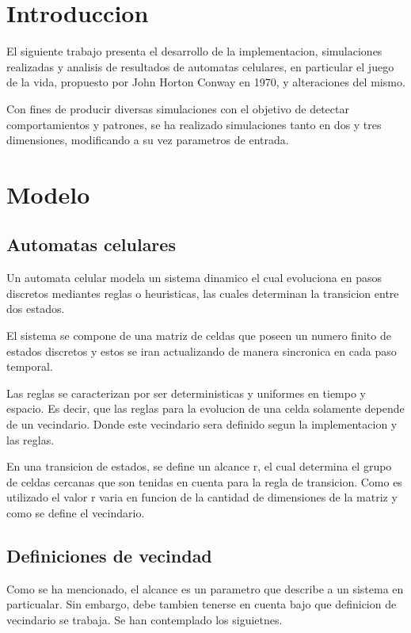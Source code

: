\documentclass[11pt]{article}
\begin{document}
    \tableofcontents


    \section{Introduccion}
    El siguiente trabajo presenta el desarrollo de la implementacion, simulaciones realizadas y analisis de resultados de
    automatas celulares, en particular el juego de la vida, propuesto por John Horton Conway en 1970, y alteraciones del mismo.

    Con fines de producir diversas simulaciones con el objetivo de detectar comportamientos y patrones, se ha realizado
    simulaciones tanto en dos y tres dimensiones, modificando a su vez parametros de entrada.

    \section{Modelo}

    \subsection{Automatas celulares}

    Un automata celular modela un sistema dinamico el cual evoluciona en pasos discretos mediantes reglas o heuristicas,
     las cuales determinan la transicion entre dos estados.

    El sistema se compone de una matriz de celdas que poseen un numero finito de estados discretos y estos se iran actualizando
    de manera sincronica en cada paso temporal.

    Las reglas se caracterizan por ser deterministicas y uniformes en tiempo y espacio. Es decir, que las reglas para la evolucion
    de una celda solamente depende de un vecindario. Donde este vecindario sera definido segun la implementacion y las reglas.

    En una transicion de estados, se define un alcance r, el cual determina el grupo de celdas cercanas que son tenidas
    en cuenta para la regla de transicion. Como es utilizado el valor r varia en funcion de la cantidad de dimensiones de
    la matriz y como se define el vecindario.

    \subsection{Definiciones de vecindad}
    Como se ha mencionado, el alcance es un parametro que describe a un sistema en particualar. Sin embargo, debe tambien
    tenerse en cuenta bajo que definicion de vecindario se trabaja. Se han contemplado los siguietnes.
\end{document}
